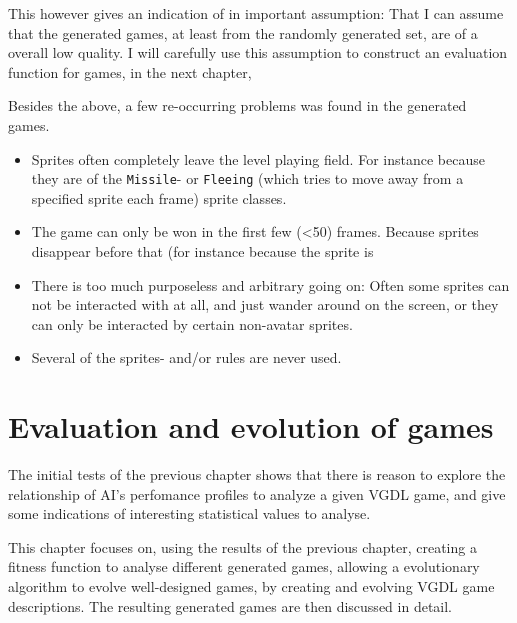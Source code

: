 \documentclass[a4paper,titlepage,final]{report}
\begin{document}
This however gives an indication of in important assumption: That I can assume that the generated games, at least from the randomly generated set, are of a overall low quality.
I will carefully use this assumption to construct an evaluation function for games, in the next chapter,

Besides the above, a few re-occurring problems was found in the generated games.

\begin{itemize}
\item Sprites often completely leave the level playing field. 
For instance because they are of the \texttt{Missile}- or \texttt{Fleeing} (which tries to move away from a specified sprite each frame) sprite classes.
\item The game can only be won in the first few (<50) frames. 
Because sprites disappear before that (for instance  because the sprite is \
\item There is too much purposeless and arbitrary going on: 
Often some sprites can not be interacted with at all, and just wander around on the screen, or they can only be interacted by certain non-avatar sprites.
\item Several of the sprites- and/or rules are never used.
\end{itemize}





\chapter{Evaluation and evolution of games}
\label{ch_task2}

The initial tests of the previous chapter shows that there is reason to explore the relationship of AI's perfomance profiles to analyze a given VGDL game, and give some indications of interesting statistical values to analyse.

This chapter focuses on, using the results of the previous chapter, creating a fitness function to analyse different generated games, allowing a evolutionary algorithm to evolve well-designed games, by creating and evolving VGDL game descriptions.
The resulting generated games are then discussed in detail.
\end{document}
